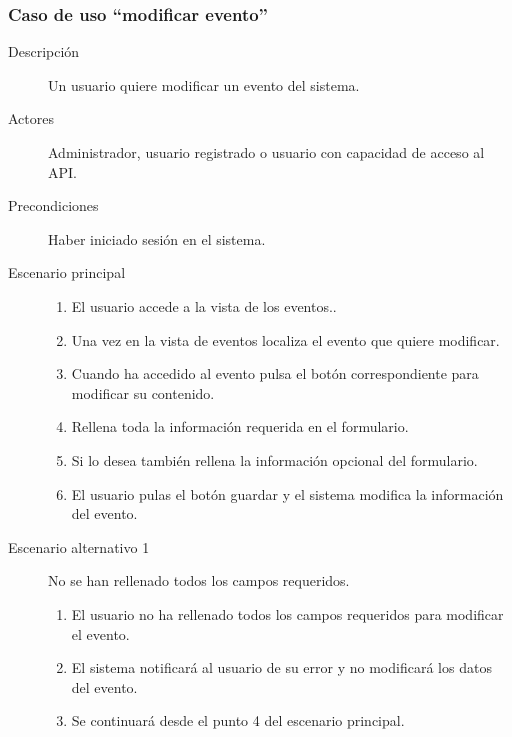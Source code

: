 \subsubsection{Caso de uso ``modificar evento''}
\begin{description}
\item[Descripción]  Un usuario quiere modificar un evento del sistema.
\item[Actores]  Administrador, usuario registrado o usuario con capacidad de acceso al API.
\item[Precondiciones]  Haber iniciado sesión en el sistema.
\item[Escenario principal]	\hfill
							\begin{enumerate}
							\item El usuario accede a la vista de los eventos..
							\item Una vez en la vista de eventos localiza el evento que quiere modificar.
							\item Cuando ha accedido al evento pulsa el botón correspondiente para modificar su contenido.
							\item Rellena toda la información requerida en el formulario.
							\item Si lo desea también rellena la información opcional del formulario.
							\item El usuario pulas el botón guardar y el sistema modifica la información del evento.
							\end{enumerate}
\item[Escenario alternativo 1] No se han rellenado todos los campos requeridos.
							\begin{enumerate}
							\item El usuario no ha rellenado todos los campos requeridos para modificar el evento.
							\item El sistema notificará al usuario de su error y no modificará los datos del evento.
							\item Se continuará desde el punto 4 del escenario principal.
							\end{enumerate}
\end{description}


